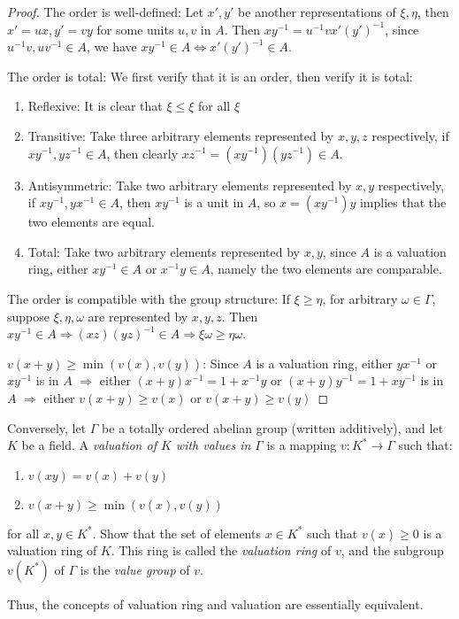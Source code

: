 \documentclass{solution}
\begin{document}
\begin{proof}
    The order is well-defined: Let $x', y'$ be another representations of $\xi, \eta$, then $x' = ux, y' = vy$ for some units $u, v$ in $A$. Then $xy ^{-1} = u ^{-1} v x'(y') ^{-1}$, since $u ^{-1} v, u v ^{-1} \in A$, we have $xy ^{-1} \in A \Leftrightarrow x' (y')^{-1} \in A$.

    The order is total: We first verify that it is an order, then verify it is total:
    \begin{enumerate}
        \item Reflexive: It is clear that $\xi \le \xi$ for all $\xi$
        \item Transitive: Take three arbitrary elements represented by $x, y, z$ respectively, if $x y ^{-1}, y z ^{-1} \in A$, then clearly $x z ^{-1} = (xy ^{-1})(y z ^{-1}) \in A$.
        \item Antisymmetric: Take two arbitrary elements represented by $x, y$ respectively, if $x y ^{-1}, y x ^{-1} \in A$, then $x y ^{-1}$ is a unit in $A$, so $x = (x y ^{-1})y$ implies that the two elements are equal.
        \item Total: Take two arbitrary elements represented by $x, y$, since $A$ is a valuation ring, either $x y ^{-1} \in A$ or $x ^{-1} y \in A$, namely the two elements are comparable.
    \end{enumerate}

    The order is compatible with the group structure: If $\xi \ge \eta$, for arbitrary $\omega \in \Gamma$, suppose $\xi, \eta, \omega$ are represented by $x, y, z$. Then $x y ^{-1} \in A \Rightarrow (xz)(yz)^{-1} \in A \Rightarrow \xi \omega \ge \eta \omega$.

    $v(x + y) \ge \min (v(x), v(y))$: Since $A$ is a valuation ring, either $yx ^{-1}$ or $x y ^{-1}$ is in $A$ $\Rightarrow$ either $(x + y) x ^{-1} = 1 + x ^{-1} y$ or $(x + y) y ^{-1} = 1 + x y ^{-1}$ is in $A$ $\Rightarrow$ either $v(x + y) \ge v(x)$ or $v(x + y) \ge v(y)$
\end{proof}

\begin{problem}
    Conversely, let $\Gamma$ be a totally ordered abelian group (written additively), and let $K$ be a field. A \textit{valuation of $K$ with values in $\Gamma$} is a mapping $v: K^* \rightarrow \Gamma$ such that:
    \begin{enumerate}
        \item $v(xy) = v(x) + v(y)$
        \item $v(x + y) \ge \min (v(x), v(y))$
    \end{enumerate}
    for all $x, y \in K^*$. Show that the set of elements $x \in K^*$ such that $v(x) \ge 0$ is a valuation ring of $K$. This ring is called the \textit{valuation ring} of $v$, and the subgroup $v(K^*)$ of $\Gamma$ is the \textit{value group} of $v$.

    Thus, the concepts of valuation ring and valuation are essentially equivalent.
\end{problem}
\end{document}
